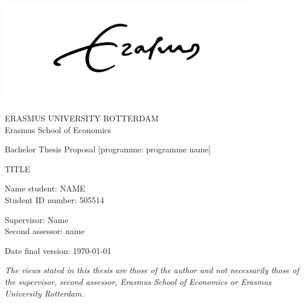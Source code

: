 \documentclass[11pt,a4paper]{article}
\begin{document}
\begin{center}
    \centering
    \includegraphics[width=11cm]{logoEURR (1).jpg}
    \newline
 {\Large ERASMUS UNIVERSITY ROTTERDAM \\ Erasmus School of Economics  \par}
    \vspace*{0.6cm}
    {\Large Bachelor Thesis Proposal [programme: programme name]\par}
\vspace*{0.6cm}
    {\Huge TITLE \par}
    \vspace{0.6cm}

    {\Large Name student: NAME \\ Student ID number: 505514 \par}
    \vspace{2cm}
    {\Large Supervisor: Name \\ Second assessor: name \par}
    \vspace{1cm}
    {\Large Date final version: \today \par}
    \vspace{1cm}
    {\em The views stated in this thesis are those of the author and not necessarily those of the supervisor, second assessor, Erasmus School of Economics or Erasmus University Rotterdam.}
    \end{center}
\clearpage
\end{document}

